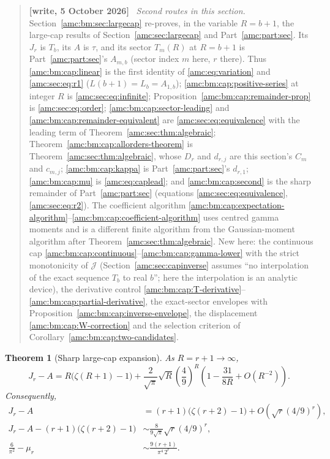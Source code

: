 \documentclass[11pt,letterpaper]{article}
\newtheorem{theorem}{Theorem}[section]
\theoremstyle{remark}\newtheorem{remark}[theorem]{Remark}
\newenvironment{writenotedated}[1]{\par\smallskip\begin{quote}\small\textbf{[write, #1]}\ }{\end{quote}\smallskip}
\begin{document}
\begin{writenotedated}{5 October 2026}
\emph{Second routes in this section.} Section~\ref{amc:bm:sec:largecap} re-proves, in the variable $R=b+1$, the large-cap results of Section~\ref{amc:sec:largecap} and Part~\ref{amc:part:sec}. Its $J_r$ is $T_b$, its $A$ is $\tau$, and its sector $T_m(R)$ at $R=b+1$ is Part~\ref{amc:part:sec}'s $A_{m,b}$ (sector index $m$ here, $r$ there). Thus \eqref{amc:bm:cap:linear} is the first identity of \eqref{amc:eq:variation} and \eqref{amc:sec:eq:r1} ($L(b+1)=L_b=A_{1,b}$); \eqref{amc:bm:cap:positive-series} at integer $R$ is \eqref{amc:sec:eq:infinite}; Proposition~\ref{amc:bm:cap:remainder-prop} is \eqref{amc:sec:eq:order}; \eqref{amc:bm:cap:sector-leading} and \eqref{amc:bm:cap:remainder-equivalent} are \eqref{amc:sec:eq:equivalence} with the leading term of Theorem~\ref{amc:sec:thm:algebraic}; Theorem~\ref{amc:bm:cap:allorders-theorem} is Theorem~\ref{amc:sec:thm:algebraic}, whose $D_r$ and $d_{r,j}$ are this section's $C_m$ and $c_{m,j}$; \eqref{amc:bm:cap:kappa} is Part~\ref{amc:part:sec}'s $d_{r,1}$; \eqref{amc:bm:cap:mu} is \eqref{amc:eq:caplead}; and \eqref{amc:bm:cap:second} is the sharp remainder of Part~\ref{amc:part:sec} (equations \eqref{amc:sec:eq:equivalence}, \eqref{amc:sec:eq:r2}). The coefficient algorithm \eqref{amc:bm:cap:expectation-algorithm}--\eqref{amc:bm:cap:coefficient-algorithm} uses centred gamma moments and is a different finite algorithm from the Gaussian-moment algorithm after Theorem~\ref{amc:sec:thm:algebraic}. New here: the continuous cap \eqref{amc:bm:cap:continuous}--\eqref{amc:bm:cap:gamma-lower} with the strict monotonicity of $\mathcal J$ (Section~\ref{amc:sec:capinverse} assumes ``no interpolation of the exact sequence $T_b$ to real $b$''; here the interpolation is an analytic device), the derivative control \eqref{amc:bm:cap:T-derivative}--\eqref{amc:bm:cap:partial-derivative}, the exact-sector envelopes with Proposition~\ref{amc:bm:cap:inverse-envelope}, the displacement \eqref{amc:bm:cap:W-correction} and the selection criterion of Corollary~\ref{amc:bm:cap:two-candidates}.
\end{writenotedated}

\begin{theorem}[Sharp large-cap expansion]\label{amc:bm:cap:main}
As $R=r+1\to\infty$,
\begin{equation}\label{amc:bm:cap:sharp}
 J_r-A=R\bigl(\zeta(R+1)-1\bigr)
 +\frac2{\sqrt\pi}\sqrt R\left(\frac49\right)^R
 \left(1-\frac{31}{8R}+O(R^{-2})\right).
\end{equation}
Consequently,
\begin{align}
 J_r-A&=(r+1)\bigl(\zeta(r+2)-1\bigr)
       +O\!\left(\sqrt r(4/9)^r\right),\label{amc:bm:cap:first}\\
 J_r-A-(r+1)\bigl(\zeta(r+2)-1\bigr)
 &\sim\frac8{9\sqrt\pi}\sqrt r(4/9)^r,\label{amc:bm:cap:second}\\
 \frac6{\pi^2}-\mu_r&\sim\frac{9(r+1)}{\pi^4\,2^r}.\label{amc:bm:cap:mu}
\end{align}
\end{theorem}
\end{document}
